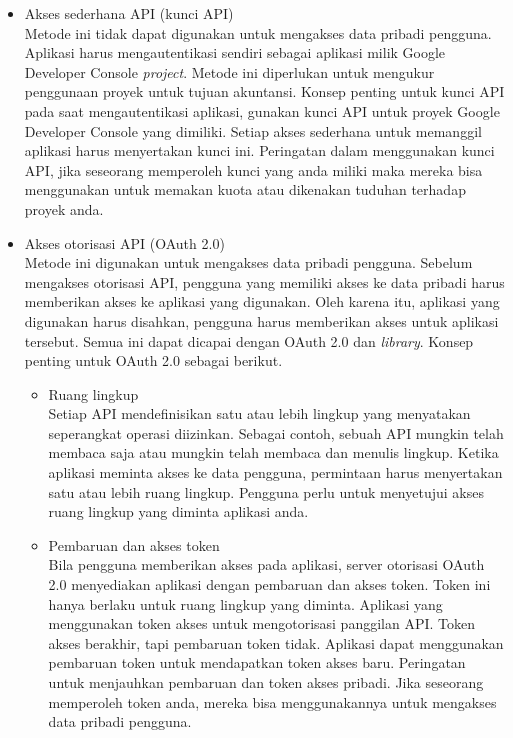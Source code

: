 \begin{itemize}
\item Akses sederhana API (kunci API)\\
Metode ini tidak dapat digunakan untuk mengakses data pribadi pengguna. Aplikasi harus mengautentikasi sendiri sebagai aplikasi milik Google Developer Console {\it project}. Metode ini diperlukan untuk mengukur penggunaan proyek untuk tujuan akuntansi.
Konsep penting untuk kunci API pada saat mengautentikasi aplikasi, gunakan kunci API untuk proyek Google Developer Console yang dimiliki. Setiap akses sederhana untuk memanggil aplikasi harus menyertakan kunci ini. Peringatan dalam menggunakan kunci API, jika seseorang memperoleh kunci yang anda miliki maka mereka bisa menggunakan untuk memakan kuota atau dikenakan tuduhan terhadap proyek anda.

\item Akses otorisasi API (OAuth 2.0)\\
Metode ini digunakan untuk mengakses data pribadi pengguna. Sebelum mengakses otorisasi API, pengguna yang memiliki akses ke data pribadi harus memberikan akses ke aplikasi yang digunakan. Oleh karena itu, aplikasi yang digunakan harus disahkan, pengguna harus memberikan akses untuk aplikasi tersebut. Semua ini dapat dicapai dengan OAuth 2.0 dan {\it library}.
Konsep penting untuk OAuth 2.0 sebagai berikut.
    \begin{itemize}
    \item Ruang lingkup\\
    Setiap API mendefinisikan satu atau lebih lingkup yang menyatakan seperangkat operasi diizinkan. Sebagai contoh, sebuah API mungkin telah membaca saja atau mungkin telah membaca dan menulis lingkup. Ketika aplikasi meminta akses ke data pengguna, permintaan harus menyertakan satu atau lebih ruang lingkup. Pengguna perlu untuk menyetujui akses ruang lingkup yang diminta aplikasi anda.
    
    \item Pembaruan dan akses token\\
    Bila pengguna memberikan akses pada aplikasi, server otorisasi OAuth 2.0 menyediakan aplikasi dengan pembaruan dan akses token. Token ini hanya berlaku untuk ruang lingkup yang diminta. Aplikasi yang menggunakan token akses untuk mengotorisasi panggilan API. Token akses berakhir, tapi pembaruan token tidak. Aplikasi dapat menggunakan pembaruan token untuk mendapatkan token akses baru.
    Peringatan untuk menjauhkan pembaruan dan token akses pribadi. Jika seseorang memperoleh token anda, mereka bisa menggunakannya untuk mengakses data pribadi pengguna.
    

\end{itemize}
\end{itemize}
